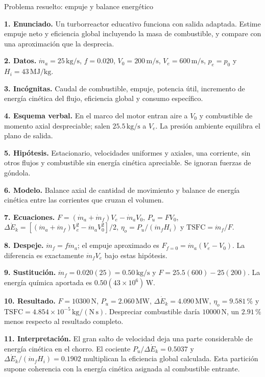 \begin{studiumworked}{Problema resuelto: empuje y balance energético}

\textbf{1. Enunciado.} Un turborreactor educativo funciona con salida adaptada. Estime empuje neto y eficiencia global incluyendo la masa de combustible, y compare con una aproximación que la desprecia.

\textbf{2. Datos.} $\dot m_a=25\,\mathrm{kg/s}$, $f=0.020$, $V_0=200\,\mathrm{m/s}$, $V_e=600\,\mathrm{m/s}$, $p_e=p_0$ y $H_i=43\,\mathrm{MJ/kg}$.

\textbf{3. Incógnitas.} Caudal de combustible, empuje, potencia útil, incremento de energía cinética del flujo, eficiencia global y consumo específico.

\textbf{4. Esquema verbal.} En el marco del motor entran aire a $V_0$ y combustible de momento axial despreciable; salen $25.5\,\mathrm{kg/s}$ a $V_e$. La presión ambiente equilibra el plano de salida.

\textbf{5. Hipótesis.} Estacionario, velocidades uniformes y axiales, una corriente, sin otros flujos y combustible sin energía cinética apreciable. Se ignoran fuerzas de góndola.

\textbf{6. Modelo.} Balance axial de cantidad de movimiento y balance de energía cinética entre las corrientes que cruzan el volumen.

\textbf{7. Ecuaciones.} $F=(\dot m_a+\dot m_f)V_e-\dot m_aV_0$, $P_u=FV_0$, $\Delta\dot E_k=[(\dot m_a+\dot m_f)V_e^2-\dot m_aV_0^2]/2$, $\eta_o=P_u/(\dot m_fH_i)$ y $\mathrm{TSFC}=\dot m_f/F$.

\textbf{8. Despeje.} $\dot m_f=f\dot m_a$; el empuje aproximado es $F_{f=0}=\dot m_a(V_e-V_0)$. La diferencia es exactamente $\dot m_fV_e$ bajo estas hipótesis.

\textbf{9. Sustitución.} $\dot m_f=0.020(25)=0.50\,\mathrm{kg/s}$ y $F=25.5(600)-25(200)$. La energía química aportada es $0.50(43\times10^6)\,\mathrm{W}$.

\textbf{10. Resultado.} $F=10300\,\mathrm{N}$, $P_u=2.060\,\mathrm{MW}$, $\Delta\dot E_k=4.090\,\mathrm{MW}$, $\eta_o=9.581\,\text{\%}$ y $\mathrm{TSFC}=4.854\times10^{-5}\,\mathrm{kg/(N\,s)}$. Despreciar combustible daría $10000\,\mathrm{N}$, un $2.91\,\text{\%}$ menos respecto al resultado completo.

\textbf{11. Interpretación.} El gran salto de velocidad deja una parte considerable de energía cinética en el chorro. El cociente $P_u/\Delta\dot E_k=0.5037$ y $\Delta\dot E_k/(\dot m_fH_i)=0.1902$ multiplican la eficiencia global calculada. Esta partición supone coherencia con la energía cinética asignada al combustible entrante.


\end{studiumworked}
